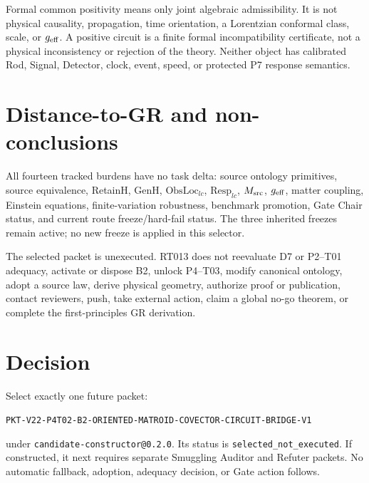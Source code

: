 \documentclass[11pt]{article}
\begin{document}
Formal common positivity means only joint algebraic admissibility.  It is not
physical causality, propagation, time orientation, a Lorentzian conformal
class, scale, or \(g_{\rm eff}\).  A positive circuit is a finite formal
incompatibility certificate, not a physical inconsistency or rejection of the
theory.  Neither object has calibrated Rod, Signal, Detector, clock, event,
speed, or protected P7 response semantics.

\section{Distance-to-GR and non-conclusions}

All fourteen tracked burdens have no task delta: source ontology primitives,
source equivalence, RetainH, GenH, \(\mathrm{ObsLoc}_{lc}\),
\(\mathrm{Resp}_{lc}\), \(M_{\rm src}\), \(g_{\rm eff}\), matter coupling,
Einstein equations, finite-variation robustness, benchmark promotion, Gate
Chair status, and current route freeze/hard-fail status.  The three inherited
freezes remain active; no new freeze is applied in this selector.

The selected packet is unexecuted.  RT013 does not reevaluate D7 or P2--T01
adequacy, activate or dispose B2, unlock P4--T03, modify canonical ontology,
adopt a source law, derive physical geometry, authorize proof or publication,
contact reviewers, push, take external action, claim a global no-go theorem,
or complete the first-principles GR derivation.

\section{Decision}

Select exactly one future packet:
\begin{center}
\texttt{PKT-V22-P4T02-B2-ORIENTED-MATROID-COVECTOR-CIRCUIT-BRIDGE-V1}
\end{center}
under \texttt{candidate-constructor@0.2.0}.  Its status is
\texttt{selected\_not\_executed}.  If constructed, it next requires separate
Smuggling Auditor and Refuter packets.  No automatic fallback, adoption,
adequacy decision, or Gate action follows.
\end{document}
